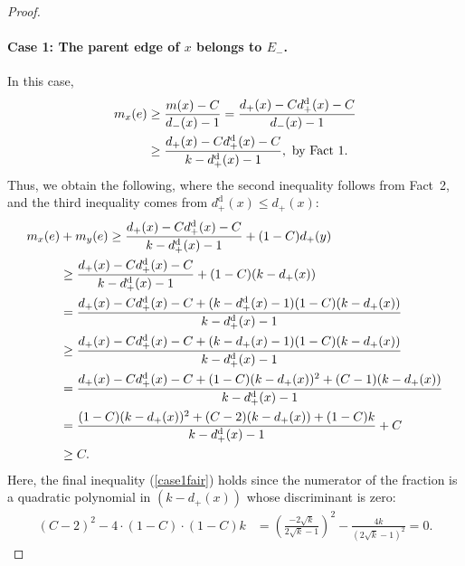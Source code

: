 \documentclass[smallextended]{svjour3}
\newcommand{\er}{\ensuremath{E_{-}}\xspace}
\def\dc{d_{+}}
\def\dd{d_{+}^{\text{d}}}
\def\dr{d_{-}}
\begin{document}
\begin{proof}
\paragraph{Case 1: The parent edge of $x$ belongs to $\er$.} 
In this case,
\begin{align}
\notag m_x(e) & \geq \frac{m(x)-C}{\dr(x)-1} = \frac{\dc(x)-C\dd(x)-C}{\dr(x)-1}\\
\label{case1mx}       & \geq \frac{\dc(x)-C\dd(x)-C}{k-\dd(x)-1}, \text{ by Fact 1.}
\end{align}
Thus, we obtain the following, where the second inequality follows from Fact~2, and the third inequality comes from $\dd(x)\leq \dc(x)$:
\begin{align}
\notag m_x(e)&+m_y(e) \geq \frac{\dc(x)-C\dd(x)-C}{k-\dd(x)-1} + (1-C)\dc(y)\\
\notag & \geq \frac{\dc(x)-C\dd(x)-C}{k-\dd(x)-1} + (1-C)(k-\dc(x))
\\
\notag & = \frac{\dc(x)-C\dd(x)-C+(k-\dd(x)-1)(1-C)(k-\dc(x))}{k-\dd(x)-1}\\
\notag & \geq \frac{\dc(x)-C\dd(x)-C+(k-\dc(x)-1)(1-C)(k-\dc(x))}{k-\dd(x)-1}\\
\notag & = \frac{\dc(x)-C\dd(x)-C+(1-C)(k-\dc(x))^2+(C-1)(k-\dc(x))}{k-\dd(x)-1}\\
\notag&= \frac{(1-C)(k-\dc(x))^2+(C-2)(k-\dc(x))+(1-C)k}{k-\dd(x)-1}+C\\
&\geq C. \label{case1fair}
\end{align}
Here, the final inequality (\ref{case1fair}) holds since the numerator of the fraction is a quadratic polynomial in $(k-\dc(x))$ whose discriminant is zero:
\begin{align*}
(C-2)^2-4\cdot (1-C)\cdot(1-C)k&=\left(\frac{-2\sqrt{k}}{2\sqrt{k}-1}\right)^2-\frac{4k}{\left(2\sqrt{k}-1\right)^2}=0.
\end{align*} 


\end{proof}
\end{document}

